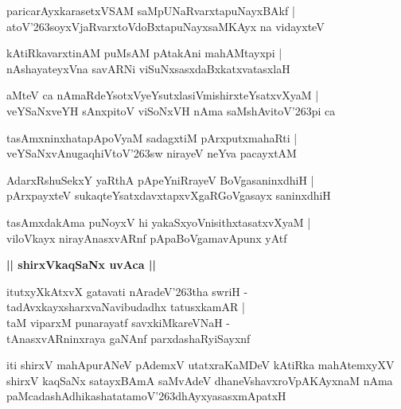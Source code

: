 \documentclass[twoside,12pt,openright]{book}
\def\S{\char'263}
\newcounter{shloka}[chapter]
\def\uvaca#1{\centerline{{\large\textbf{#1}}}}
\begin{document}
\begin{shloka}%
paricarAyxkarasetxVSAM saMpUNaRvarxtapuNayxBAkf |\\
atoV\S soyxVjaRvarxtoVdoBxtapuNayxsaMKAyx na vidayxteV 
\end{shloka}

\begin{shloka}%
kAtiRkavarxtinAM puMsAM pAtakAni mahAMtayxpi |\\
nAshayateyxVna savARNi viSuNxsasxdaBxkatxvatasxlaH 
\end{shloka}

\begin{shloka}%
aMteV ca nAmaRdeYsotxVyeYsutxlasiVmishirxteYsatxvXyaM |\\
veYSaNxveYH sAnxpitoV viSoNxVH nAma saMshAvitoV\S pi ca 
\end{shloka}

\begin{shloka}%
tasAmxninxhatapApoVyaM sadagxtiM pArxputxmahaRti |\\
veYSaNxvAnugaqhiVtoV\S sw nirayeV neYva pacayxtAM 
\end{shloka}

\begin{shloka}%
AdarxRshuSekxY yaRthA pApeYniRrayeV BoVgasaninxdhiH |\\
pArxpayxteV sukaqteYsatxdavxtapxvXgaRGoVgasayx saninxdhiH 
\end{shloka}

\begin{shloka}%
tasAmxdakAma puNoyxV hi yakaSxyoVnisithxtasatxvXyaM |\\
viloVkayx nirayAnasxvARnf pApaBoVgamavApunx yAtf
\end{shloka}

\uvaca{|| shirxVkaqSaNx uvAca ||}
 
\begin{shloka}%
itutxyXkAtxvX gatavati nAradeV\S tha swriH -\\
tadAvxkayxsharxvaNavibudadhx tatusxkamAR |\\
taM viparxM punarayatf savxkiMkareVNaH -\\
tAnasxvARninxraya gaNAnf parxdashaRyiSayxnf 
\end{shloka}

\begin{center}
iti shirxV mahApurANeV pAdemxV utatxraKaMDeV kAtiRka mahAtemxyXV shirxV kaqSaNx satayxBAmA 
saMvAdeV dhaneVshavxroVpAKAyxnaM nAma paMcadashAdhikashatatamoV\S dhAyxyasasxmApatxH 
\end{center}
\end{document}
